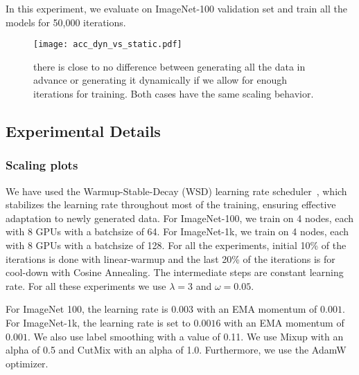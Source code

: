 In this experiment, we evaluate on ImageNet-100 validation set and train all the models for 50,000 iterations. 

\begin{figure}
    \centering
    \texttt{[image: acc\_dyn\_vs\_static.pdf]}
    \caption{there is close to no difference between generating all the data in advance or generating it dynamically if we allow for enough iterations for training. Both cases have the same scaling behavior.}
    \label{fig:acc_dyn_vs_static}
\end{figure}

\subsection{Experimental Details}\label{app:exp_details}
\subsubsection{Scaling plots}\label{app:details_scaling}
We have used the Warmup-Stable-Decay (WSD) learning rate scheduler~\citep{hu2024minicpm}, which stabilizes the learning rate throughout most of the training, ensuring effective adaptation to newly generated data.
For ImageNet-100, we train on 4 nodes, each with 8 GPUs with a batchsize of 64. For ImageNet-1k, we train on 4 nodes, each with 8 GPUs with a batchsize of 128. For all the experiments, initial 10\% of the iterations is done with linear-warmup and the last 20\% of the iterations is for cool-down with Cosine Annealing. The intermediate steps are constant learning rate. For all these experiments we use $\lambda=3$ and $\omega=0.05$.

For ImageNet 100, the learning rate is $0.003$ with an EMA momentum of $0.001$. For ImageNet-1k, the learning rate is set to $0.0016$ with an EMA momentum of $0.001$. We also use label smoothing with a value of 0.11. We use Mixup with an alpha of 0.5 and CutMix with an alpha of 1.0. Furthermore, we use the AdamW optimizer. 

